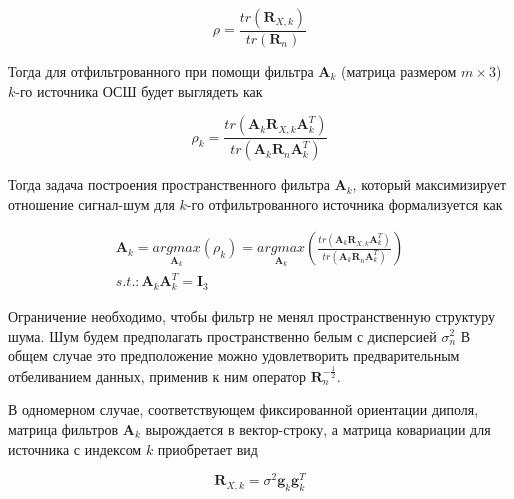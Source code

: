 \begin{equation}
    \rho = \frac{tr(\mathbf{R}_{X,k})}{tr(\mathbf{R}_n)}
\end{equation}

Тогда для отфильтрованного  при помощи фильтра $\mathbf{A}_k$
(матрица размером $m \times 3$) $k$-го источника ОСШ будет выглядеть как

\begin{equation}
    \rho_k = \frac{tr(\mathbf{A}_k \mathbf{R}_{X,k} \mathbf{A}_k^T)}{tr(\mathbf{A}_k \mathbf{R}_n \mathbf{A}_k^T)}
\end{equation}

Тогда задача построения пространственного фильтра $\mathbf{A}_k$,
который максимизирует отношение сигнал-шум
для $k$-го отфильтрованного источника формализуется как

\begin{gather}
    \mathbf{A}_k = \underset{\mathbf{A}_k}{argmax}(\rho_k) =
    \underset{\mathbf{A}_k}{argmax}\left(
        \frac{tr(\mathbf{A}_k \mathbf{R}_{X,k} \mathbf{A}_k^T)}
             {tr(\mathbf{A}_k \mathbf{R}_n \mathbf{A}_k^T)}
         \right)\\
    \label{max_snr_objective}
    s.t.: \mathbf{A}_k\mathbf{A}_k^T = \mathbf{I}_3
\end{gather}

Ограничение необходимо, чтобы фильтр не менял пространственную структуру шума.
Шум будем предполагать пространственно белым с дисперсией $\sigma^2_n$
В общем случае это предположение можно удовлетворить
предварительным отбеливанием данных, применив к ним
оператор $\mathbf{R}_n^{-\frac{1}{2}}$.


В одномерном случае, соответствующем фиксированной ориентации диполя,
матрица фильтров $\mathbf{A}_k$ вырождается в вектор-строку,
а матрица ковариации для источника с индексом $k$ приобретает вид

\begin{equation}
    \mathbf{R}_{X,k} = \sigma^2 \mathbf{g}_k \mathbf{g}_k^T
\end{equation}

